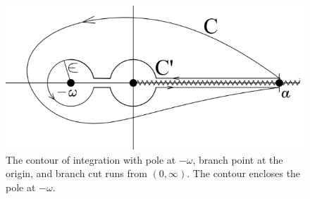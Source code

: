 \begin{figure}
    \centering
    \includegraphics[width=.75\textwidth]{c31.PNG}
    \caption{The contour of integration with pole at $-\omega$, branch point at the origin, and branch cut runs from $(0,\infty)$. The contour encloses the pole at $-\omega$.}
    \label{ch32}
\end{figure}

